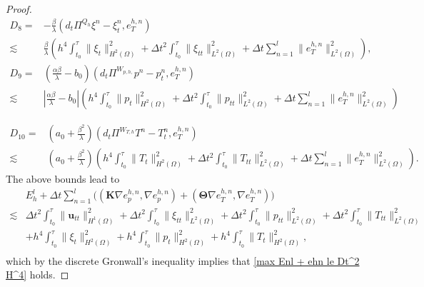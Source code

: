 \documentclass{article}
\numberwithin{equation}{section}
\begin{document}
\begin{proof}
  \begin{equation*}    
\begin{aligned}  
 D_8=& -\frac\beta\lambda(d_t\Pi^{Q_h} \xi^n- \xi_t^n, e_T^{h,n}) \\
     \lesssim&
  \frac\beta\lambda(h^4
    \int_{t_0}^{\tau}\| \xi_t  \|_{H^2(\Omega)}^2
   + \Delta t^2  \int_{t_0}^{\tau}\| \xi_{tt}  \|_{L^2(\Omega)}^2
    + \Delta t \sum_{n=1}^l        \| e_{T}^{h,n} \|_{L^2(\Omega)}^2
   ),                    
\end{aligned}
\end{equation*} 
  \begin{equation*}    
\begin{aligned}  
 D_9=&  (\frac{\alpha\beta}{\lambda}-b_0)(d_t\Pi^{W_{p,h,}}p^n- p_t^n, e_T^{h,n})\\ 
  \lesssim&
   |\frac{\alpha\beta}{\lambda}-b_0|(h^4
    \int_{t_0}^{\tau}\| p_t  \|_{H^2(\Omega)}^2
   + \Delta t^2  \int_{t_0}^{\tau}\| p_{tt}  \|_{L^2(\Omega)}^2
    + \Delta t \sum_{n=1}^l        \| e_{T}^{h,n} \|_{L^2(\Omega)}^2
   )                                   
\end{aligned}
\end{equation*} 

  \begin{equation*}    
\begin{aligned}  
 D_{10}= & (a_0+\frac{\beta^2}{\lambda})(d_t\Pi^{W_{T,h}}T^n - T_t^n, e_T^{h,n}) \\
   \lesssim&(a_0+\frac{\beta^2}{\lambda})(h^4
    \int_{t_0}^{\tau}\|T_t  \|_{H^2(\Omega)}^2
   + \Delta t^2  \int_{t_0}^{\tau}\| T_{tt}  \|_{L^2(\Omega)}^2
    + \Delta t \sum_{n=1}^l        \| e_{T}^{h,n} \|_{L^2(\Omega)}^2
   ).                               
\end{aligned}
\end{equation*} 
The above bounds lead to
  \begin{equation} 
\begin{aligned} 
 & E_h^l + \Delta t \sum_{n=1}^l \big(  (\bm K\nabla e_p^{h,n},\nabla  e_p^{h,n})
                              +  (\bm\Theta\nabla e_T^{h,n},\nabla  e_T^{h,n})  \big) \\
 \lesssim &\Delta t^2 \int_{t_0}^{\tau}\| \bm u_{tt}  \|_{H^1(\Omega)}^2
           +\Delta t^2 \int_{t_0}^{\tau}\| \xi_{tt}  \|_{L^2(\Omega)}^2
            +\Delta t^2 \int_{t_0}^{\tau}\| p_{tt}  \|_{L^2(\Omega)}^2
          +\Delta t^2 \int_{t_0}^{\tau}\| T_{tt}  \|_{L^2(\Omega)}^2\\
         & +h^4 \int_{t_0}^{\tau}\| \xi_t  \|_{H^2(\Omega)}^2 
         +h^4 \int_{t_0}^{\tau}\| p_t  \|_{H^2(\Omega)}^2 
          +h^4  \int_{t_0}^{\tau}\| T_t  \|_{H^2(\Omega)}^2, \\                                  
\end{aligned}
\end{equation} 
which by the discrete Gronwall’s inequality implies that \eqref{max Enl + ehn le Dt^2 H^4} holds.
\end{proof}
\end{document}
